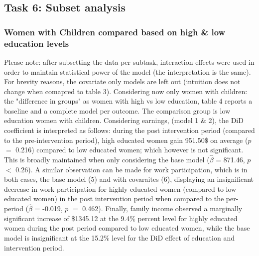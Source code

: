 \documentclass[a4paper]{article}
\begin{document}
\begin{landscape}
\end{landscape}


\subsection{Task 6: Subset analysis}

\subsubsection{Women with Children compared based on high \& low education levels}
Please note: after subsetting the data per subtask, interaction effects were used in order to maintain statistical power of the model (the interpretation is the same).
For brevity reasons, the covariate only models are left out (intuition does not change when comapred to table 3). Considering now only women with children: the "difference in groups" as women with high vs low education, table 4 reports a baseline and a complete model per outcome. The comparison group is low education women with children.
Considering earnings, (model 1 \& 2), the DiD coefficient is interpreted as follows: during the post intervention period (compared to the pre-intervention period), high educated women gain 951.50\$ on average ($p$ $=$ 0.216) compared to low educated women; which however is not significant. This is broadly maintained when only considering the base model ($\hat{\beta}$ = 871.46, $p$ $<$ 0.26). A similar observation can be made for work participation, which is in both cases, the base model (5) and with covaraites (6), displaying an insignificant decrease in work participation for highly educated women (compared to low educated women) in the post intervention period when compared to the per-period ($\hat{\beta}$ = -0.019, $p$ $=$ 0.462). Finally, family income observed a marginally significant increase of \$1345.12 at the 9.4\% percent level for highly educated women during the post period compared to low educated women, while the base model is insignificant at the 15.2\% level for the DiD effect of education and intervention period. 
\end{document}
